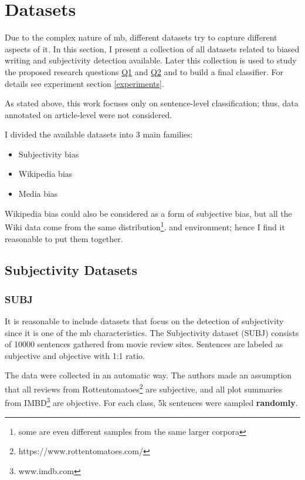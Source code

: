 \chapter{Datasets} \label{datasets}
Due to the complex nature of \gls{mb}, different datasets try to capture different aspects of it. In this section, I present a collection of all datasets related to biased writing and subjectivity detection available. Later this collection is used to study the proposed research questions \hyperref[Q1]{Q1} and \hyperref[Q2]{Q2} and to build a final classifier. For details see experiment section \ref{experiments}.

As stated above, this work focuses only on sentence-level classification; thus, data annotated on article-level were not considered.

I divided the available datasets into 3 main families: 
\begin{itemize}
    \item Subjectivity bias
    \item Wikipedia bias
    \item Media bias
\end{itemize}
Wikipedia bias could also be considered as a form of subjective bias, but all the Wiki data come from the same distribution\footnote{some are even different samples from the same larger corpora}. and environment; hence I find it reasonable to put them together.


\section{Subjectivity Datasets}

\subsection{SUBJ}
It is reasonable to include datasets that focus on the detection of subjectivity since it is one of the \gls{mb} characteristics. The Subjectivity dataset (SUBJ) \cite{Pang+Lee:04a} consists of 10000 sentences gathered from movie review sites. Sentences are labeled as subjective and objective with 1:1 ratio. 

The data were collected in an automatic way. The authors made an assumption that all reviews from Rottentomatoes\footnote{https://www.rottentomatoes.com/} are subjective, and all plot summaries from IMBD\footnote{ www.imdb.com} are objective. For each class, 5k sentences were sampled \textbf{randomly}.




